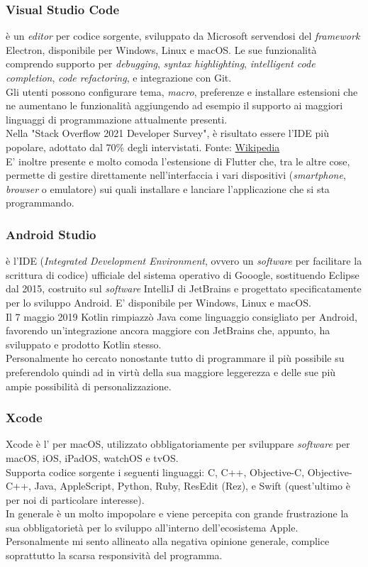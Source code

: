 \subsubsection{Visual Studio Code}
\vsc{} è un \textit{editor} per codice sorgente, sviluppato da Microsoft servendosi del \textit{framework} Electron, disponibile per Windows, Linux e macOS. Le sue funzionalità comprendo supporto per \textit{debugging}, \textit{syntax highlighting}, \textit{intelligent code completion}, \textit{code refactoring}, e integrazione con Git. \\
Gli utenti possono configurare tema, \textit{macro}, preferenze e installare estensioni che ne aumentano le funzionalità aggiungendo ad esempio il supporto ai maggiori linguaggi di programmazione attualmente presenti.\\
Nella "Stack Overflow 2021 Developer Survey", \vsc{} è risultato essere l'IDE più popolare, adottato dal 70\% degli intervistati. {\tiny Fonte: \href{https://en.wikipedia.org/wiki/Visual_Studio_Code}{Wikipedia}}\\
E' inoltre presente e molto comoda l'estensione di Flutter che, tra le altre cose, permette di gestire direttamente nell'interfaccia i vari dispositivi (\textit{smartphone}, \textit{browser} o emulatore) sui quali installare e lanciare l'applicazione che si sta programmando.

\subsubsection{Android Studio}
\astudio{} è l'IDE (\textit{Integrated Development Environment}, ovvero un \textit{software} per facilitare la scrittura di codice) ufficiale del sistema operativo di Gooogle, sostituendo Eclipse dal 2015, costruito sul \textit{software} IntelliJ di JetBrains e progettato specificatamente per lo sviluppo Android. E' disponibile per Windows, Linux e macOS.\\
Il 7 maggio 2019 Kotlin rimpiazzò Java come linguaggio consigliato per Android, favorendo un'integrazione ancora maggiore con JetBrains che, appunto, ha sviluppato e prodotto Kotlin stesso.\\
Personalmente ho cercato nonostante tutto di programmare il più possibile su \vsc{} preferendolo quindi ad \astudio{} in virtù della sua maggiore leggerezza e delle sue più ampie possibilità di personalizzazione.

\subsubsection{Xcode}
Xcode è l'\ide{} per macOS, utilizzato obbligatoriamente per sviluppare \textit{software} per macOS, iOS, iPadOS, watchOS e tvOS.\\
Supporta codice sorgente i seguenti linguaggi: C, C++, Objective-C, Objective-C++, Java, AppleScript, Python, Ruby, ResEdit (Rez), e Swift (quest'ultimo è per noi di particolare interesse).\\
In generale è un \ide{} molto impopolare e viene percepita con grande frustrazione la sua obbligatorietà per lo sviluppo all'interno dell'ecosistema Apple. Personalmente mi sento allineato alla negativa opinione generale, complice soprattutto la scarsa responsività del programma.


